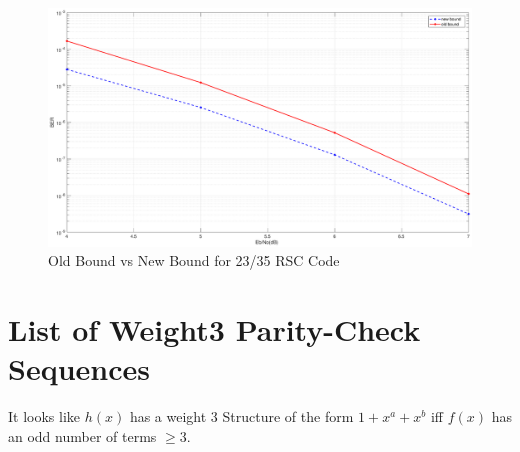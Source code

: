 \documentclass[11pt, oneside, dvipdfmx]{book}
\begin{document}
\begin{figure}[h]
\centering
		\includegraphics[width=\textwidth]{./Images/RSC_23_35.eps}
		\caption{Old Bound vs New Bound for 23/35 RSC Code}
		\label{fig3}
		\end{figure}
	
	\newpage	
\section{List of Weight3 Parity-Check Sequences}	
It looks like $h(x)$ has a weight 3 Structure of the form $1+x^a+x^b$ iff $f(x)$ has an odd number of terms $\geq 3$.
\end{document}
